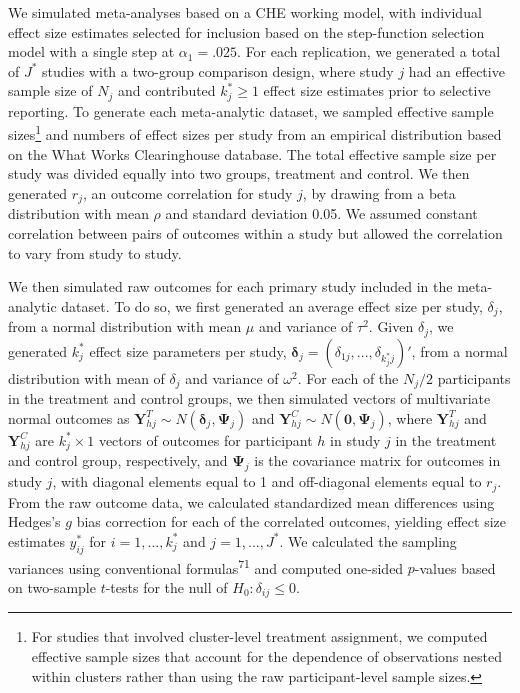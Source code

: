 \documentclass[
  man, donotrepeattitle,floatsintext]{apa7}
\begin{document}
We simulated meta-analyses based on a CHE working model, with individual effect size estimates selected
for inclusion based on the step-function selection model with a single step at \(\alpha_1 = .025\).
For each replication, we generated a total of \(J^*\) studies with a two-group comparison
design, where study \(j\) had an effective sample size of \(N_j\) and contributed \(k_j^* \geq 1\) effect size estimates prior to selective reporting.
To generate each meta-analytic dataset, we sampled effective sample sizes\footnote{For studies that involved cluster-level treatment assignment, we computed effective sample sizes that account for the dependence of observations nested within clusters rather than using the raw participant-level sample sizes.} and numbers of effect sizes per study from an empirical distribution based on the What Works Clearinghouse database.
The total effective sample size per study was divided equally into two groups, treatment and control.
We then generated \(r_j\), an outcome correlation for study \(j\), by drawing from a beta distribution with mean \(\rho\) and standard deviation 0.05.
We assumed constant correlation between pairs of outcomes within a study but allowed the correlation to vary from study to study.

We then simulated raw outcomes for each primary study included in the
meta-analytic dataset. To do so, we first generated an average effect
size per study, \(\delta_j\), from a normal distribution with mean \(\mu\) and variance
of \(\tau^2\). Given \(\delta_j\), we generated \(k_j^*\) effect size parameters per study, \(\boldsymbol\delta_j = \left(\delta_{1j},...,\delta_{k_j^* j}\right)'\), from a normal distribution with mean of \(\delta_j\) and
variance of \(\omega^2\).
For each of the \(N_j / 2\) participants in the treatment and control groups, we then simulated vectors of multivariate normal outcomes as \(\mathbf{Y}_{hj}^T \sim N(\boldsymbol\delta_j, \boldsymbol\Psi_j)\) and \(\mathbf{Y}_{hj}^C \sim N(\mathbf{0}, \boldsymbol\Psi_j)\), where \(\mathbf{Y}_{hj}^T\) and \(\mathbf{Y}_{hj}^C\) are
\(k_j^* \times 1\) vectors of outcomes for participant \(h\) in study \(j\) in the treatment and control group, respectively, and \(\boldsymbol\Psi_j\) is the covariance matrix for outcomes in study \(j\), with diagonal elements equal to 1 and off-diagonal elements equal to \(r_j\).
From the raw outcome data, we calculated standardized mean
differences using Hedges's \(g\) bias correction for each of the correlated outcomes, yielding effect size estimates \(y^*_{ij}\) for \(i=1,...,k_j^*\) and \(j = 1,...,J^*\).
We calculated the sampling variances using conventional formulas\textsuperscript{71} and computed one-sided \(p\)-values based on two-sample \(t\)-tests for the null of \(H_0: \delta_{ij} \leq 0\).
\end{document}
